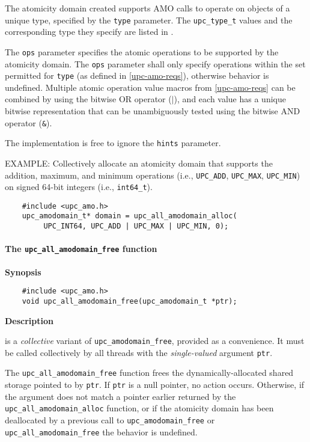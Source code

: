 \np The atomicity domain created supports AMO calls to operate on objects of a
    unique type, specified by the {\tt type} parameter.  The {\tt upc\_type\_t}
    values and the corresponding type they specify are listed in
    \upctypesection{}.

\np The {\tt ops} parameter specifies the atomic operations to be supported by
    the atomicity domain.  The {\tt ops} parameter shall only specify
    operations within the set permitted for {\tt type} (as defined in
    \ref{upc-amo-reqs}), otherwise behavior is undefined.
    Multiple atomic operation value macros from \ref{upc-amo-reqs}
    can be combined by using the bitwise OR operator ($|$), and each value has
    a unique bitwise representation that can be unambiguously tested using the
    bitwise AND operator ({\tt \&}).

\np The implementation is free to ignore the {\tt hints} parameter.

\np EXAMPLE: Collectively allocate an atomicity domain that supports the
    addition, maximum, and minimum operations (i.e., {\tt UPC\_ADD},
    {\tt UPC\_MAX}, {\tt UPC\_MIN}) on signed 64-bit integers (i.e.,
    {\tt int64\_t}).
\begin{verbatim}
    #include <upc_amo.h>
    upc_amodomain_t* domain = upc_all_amodomain_alloc(
         UPC_INT64, UPC_ADD | UPC_MAX | UPC_MIN, 0);
\end{verbatim}

\paragraph{The {\tt upc\_all\_amodomain\_free} function}

{\bf Synopsis}

\npf\vspace{-1.8em}
\begin{verbatim}
    #include <upc_amo.h>
    void upc_all_amodomain_free(upc_amodomain_t *ptr);
\end{verbatim}

{\bf Description}

 is a \emph{collective} variant of
    {\tt upc\_amodomain\_free}, provided as a convenience.  It must be called
    collectively by all threads with the \emph{single-valued} argument
    {\tt ptr}.

\np The {\tt upc\_all\_amodomain\_free} function frees the dynamically-allocated
    shared storage pointed to by {\tt ptr}.  If {\tt ptr} is a null pointer,
    no action occurs.  Otherwise, if the argument does not match a pointer
    earlier returned by the {\tt upc\_all\_amodomain\_alloc} function, or if
    the atomicity domain has been deallocated by a previous call to
    {\tt upc\_amodomain\_free} or {\tt upc\_all\_amodomain\_free} the
    behavior is undefined.

